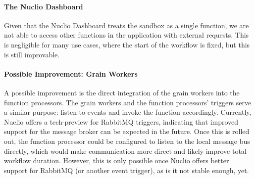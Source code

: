 \paragraph{The Nuclio Dashboard}

Given that the Nuclio Dashboard treats the sandbox as a single function, we are not able to access other functions in the application with external requests. 
This is negligible for many use cases, where the start of the workflow is fixed, but this is still improvable.

\paragraph{Possible Improvement: Grain Workers}

A possible improvement is the direct integration of the grain workers into the function processors. 
The grain workers and the function processors' triggers serve a similar purpose: listen to events and invoke the function accordingly.
Currently, Nuclio offers a tech-preview for RabbitMQ triggers, indicating that improved support for the message broker can be expected in the future.
Once this is rolled out, the function processor could be configured to listen to the local message bus directly, which would make communication more direct and likely improve total workflow duration. 
However, this is only possible once Nuclio offers better support for RabbitMQ (or another event trigger), as is it not stable enough, yet.
